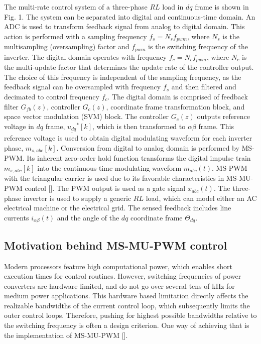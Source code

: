 \documentclass[journal]{IEEEtran}
\begin{document}
The multi-rate control system of a three-phase $RL$ load in $dq$ frame is shown in Fig. 1. The system can be separated into digital and continuous-time domain. An ADC is used to transform feedback signal from analog to digital domain. This action is performed with a sampling frequency $f_s = N_s f_{pwm}$, where $N_s$ is the multisampling (oversampling) factor and $f_{pwm}$ is the switching frequency of the inverter. The digital domain operates with frequency $f_c = N_c f_{pwm}$, where $N_c$ is the multi-update factor that determines the update rate of the controller output. The choice of this frequency is independent of the sampling frequency, as the feedback signal can be oversampled with frequency $f_s$ and then filtered and decimated to control frequency $f_c$. The digital domain is comprised of feedback filter $G_{fb}(z)$, controller $G_c(z)$, coordinate frame transformation block, and space vector modulation (SVM) block. The controller $G_c(z)$ outputs reference voltage in $dq$ frame, $\underline{u_{dq}}^*[k]$, which is then transformed to $\alpha \beta$ frame. This reference voltage is used to obtain digital modulating waveform for each inverter phase, $m_{s,abc}[k]$. Conversion from digital to analog domain is performed by MS-PWM. Its inherent zero-order hold function transforms the digital impulse train $m_{s,abc}[k]$ into the continuous-time modulating waveform $m_{abc}(t)$. MS-PWM with the triangular carrier is used due to its favorable characteristics in MS-MU-PWM control []. The PWM output is used as a gate signal $x_{abc}(t)$. The three-phase inverter is used to supply a generic $RL$ load, which can model either an AC electrical machine or the electrical grid. The sensed feedback includes line currents $i_{\alpha \beta}(t)$ and the angle of the $dq$ coordinate frame $\Theta_{dq}$. 

\subsection{Motivation behind MS-MU-PWM control}

Modern processors feature high computational power, which enables short execution times for control routines. However, switching frequencies of power converters are hardware limited, and do not go over several tens of kHz for medium power applications. This hardware based limitation directly affects the realizable bandwidths of the current control loop, which subsequently limits the outer control loops. Therefore, pushing for highest possible bandwidths relative to the switching frequency is often a design criterion. One way of achieving that is the implementation of MS-MU-PWM [].
\end{document}
